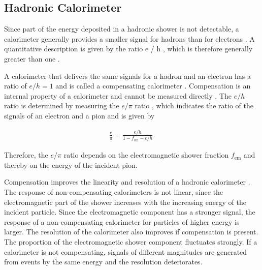 \documentclass[12pt, a4paper]{thesis}
\begin{document}
\subsection{Hadronic Calorimeter}
\label{sec:orgd771604}

Since part of the energy deposited in a hadronic shower is not
detectable, a calorimeter generally provides a smaller signal for
hadrons than for electrons \cite{fabjan03}. A quantitative description
is given by the ratio e / h , which is therefore generally greater
than one \cite{wigman18}.

A calorimeter that delivers the same signals for a hadron and an
electron has a ratio of \(e / h = 1\) and is called a compensating
calorimeter \cite{wigman18}. Compensation is an internal property of a
calorimeter \cite{kolanoski16} and cannot be measured directly
\cite{wigman18}. The \(e / h\) ratio is determined by measuring the
\(e / \pi\) ratio \cite{wigman18}, which indicates the ratio of the
signals of an electron and a pion and is given by \cite{wigman18}

\begin{align}
  \frac{e}{\pi}=\frac{e/h}{1-f_{\text{em}} - e/h}. 
\end{align}

Therefore, the \(e / \pi\) ratio depends on the electromagnetic shower
fraction \(f_{\text{em}}\) and thereby on the energy of the incident
pion.

Compensation improves the linearity and resolution of a hadronic
calorimeter \cite{wigman18,kolanoski16,fabjan03}. The response of
non-compensating calorimeters is not linear, since the electromagnetic
part of the shower increases with the increasing energy of the
incident particle. Since the electromagnetic component has a stronger
signal, the response of a non-compensating calorimeter for particles
of higher energy is larger. The resolution of the calorimeter also
improves if compensation is present. The proportion of the
electromagnetic shower component fluctuates strongly. If a calorimeter
is not compensating, signals of different magnitudes are generated
from events by the same energy and the resolution deteriorates.
\end{document}
